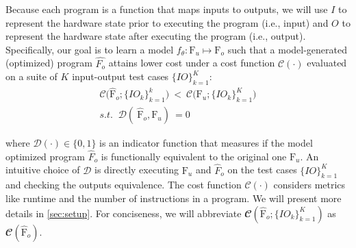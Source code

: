 \documentclass{article}
\newcommand\p{\ensuremath{{\mathrm{F}_u}}}
\begin{document}
Because each program is a function that maps inputs to outputs, we will use $I$ to represent the hardware state prior to executing the program (i.e., input) and $O$ to represent the hardware state after executing the program (i.e., output).
Specifically, our goal is to learn a model $f_{\theta}: \text{F}_u \mapsto \text{F}_o$ such that a model-generated (optimized) program $\hat{F_o}$ attains lower cost under a cost function $\mathcal{C}(\cdot)$ evaluated on a suite of $K$ input-output test cases $\{ IO \}_{k=1}^K$:
\begin{equation}
    \label{eqn:optimizaiton_goal}
    \begin{split}
        \mathcal{C} \Big(\hat{\textrm{F}}_{o}; \{IO_k\}_{k=1}^k \Big)  \ 
        < \ 
        \mathcal{C} \Big(\textrm{F}_{u}; \{IO_k\}_{k=1}^K \Big) \\
         s.t. \;\; \mathcal{D}( \ 
                        \hat{\textrm{F}}_{o}, \textrm{F}_{u} ) \ 
                        = 0  %
    \end{split}
\end{equation}

where $\mathcal{D}(\cdot) \in \{ 0, 1 \}$ is an indicator function that measures if the model optimized program $\hat{F}_o$ is functionally equivalent to the original one $\p$. 
An intuitive choice of $\mathcal{D}$ is directly executing $\p$ and $\hat{F}_o$ on the test cases $\{ IO \}_{k=1}^K$ and checking the outputs equivalence. The cost function $\mathcal{C}(\cdot)$ considers metrics like runtime and the number of instructions in a program.
We will present more details in \cref{sec:setup}.
For conciseness, we will abbreviate $\mathbfcal{C} (\hat{\textrm{F}}_{o}; \{IO_k\}_{k=1}^K)$ as $\mathbfcal{C} (\hat{\textrm{F}}_{o})$. 
\end{document}
